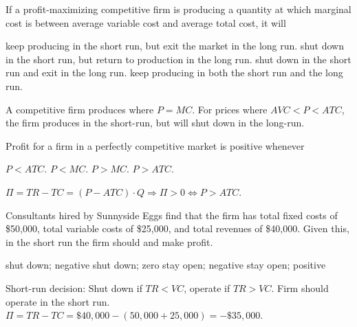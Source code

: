 \documentclass[addpoints,11pt]{exam}
\theoremstyle{definition}
\newcommand{\blank}[0]{\underline{\hspace{3cm}}}
\begin{document}
		\begin{questions}
			
	
			\question If a profit-maximizing competitive firm is producing a quantity at which marginal cost is between average variable cost and average total cost, it will
			
			\begin{choices}
				\CorrectChoice keep producing in the short run, but exit the market in the long run.
				\choice shut down in the short run, but return to production in the long run. 
				\choice shut down in the short run and exit in the long run.
				\choice keep producing in both the short run and the long run.
			\end{choices}
			
			\begin{solution}
				A competitive firm produces where $P = MC$. For prices where $AVC < P < ATC$, the firm produces in the short-run, but will shut down in the long-run.
			\end{solution}
			

\newpage
	
		
		\question Profit for a firm in a perfectly competitive market is positive whenever
		
		\begin{choices}
			\choice $P < ATC$.
			\choice  $P < MC$.
			\choice $P > MC$.
			\CorrectChoice $P >ATC$.
		\end{choices}
		
		\begin{solution}
			$\Pi = TR - TC  = (P - ATC)\cdot Q \Rightarrow \Pi >0 \iff P > ATC$.
		\end{solution}
	
		\question Consultants hired by Sunnyside Eggs find that the firm has total fixed costs of \$50,000, total variable costs of \$25,000, and total revenues of \$40,000. Given this, in the short run the firm should \blank and make \blank profit.
		
		\begin{choices}
			\choice shut down; negative
			\choice shut down; zero
			\CorrectChoice stay open; negative
			\choice stay open; positive
		\end{choices}
	
			
		\begin{solution}
			Short-run decision: Shut down if $TR<VC$, operate if $TR>VC$. Firm should operate in the short run. $\Pi = TR - TC = \$40,000 - (50,000 + 25,000) = -\$35,000.$
		\end{solution}
		

\end{questions}
\end{document}
